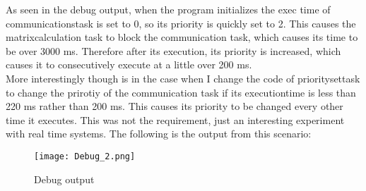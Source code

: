\documentclass[12pt,fleqn,leqno,letterpaper]{article}
\begin{document}
        As seen in the debug output, when the program initializes the exec time of communicationstask is set to 0,
        so its priority is quickly set to 2.  This causes the matrixcalculation task to block the communication task, which causes
        its time to be over 3000 ms.  Therefore after its execution, its priority is increased, which causes it to
        consecutively execute at a little over 200 ms. \\

        More interestingly though is in the case when I change the code of prioritysettask to change the prirotiy of
        the communication task if its executiontime is less than 220 ms rather than 200 ms.  This causes its priority
        to be changed every other time it executes.  This was not the requirement, just an interesting experiment with
        real time systems.  The following is the output from this scenario:

        \begin{figure}[h]
            \centering
            \texttt{[image: Debug\_2.png]}
            \caption{Debug output}
            \label{figure:debug2}
        \end{figure}
\end{document}
